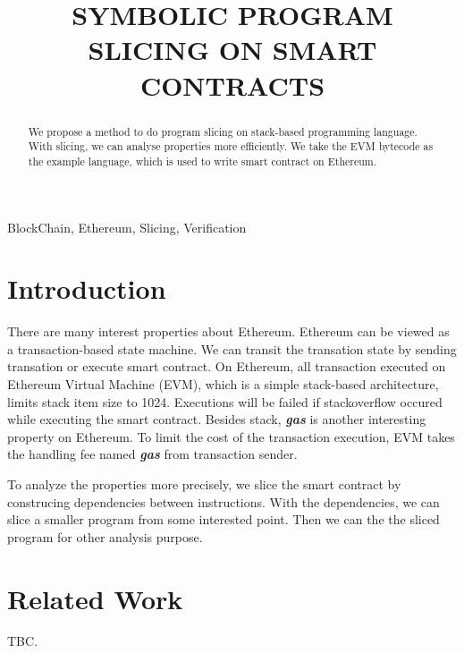 \documentclass{article}
\title{SYMBOLIC PROGRAM SLICING ON SMART CONTRACTS}
\begin{document}
%

\maketitle

%

\begin{abstract}

  We propose a method to do program slicing on stack-based programming language. With slicing, we can analyse properties more efficiently. We take the EVM bytecode\cite{wood2014ethereum} as the example language, which is used to write smart contract\cite{szabo2003advances} on Ethereum\cite{wood2014ethereum}.

\end{abstract}

\begin{keywords}
  BlockChain, Ethereum, Slicing, Verification
\end{keywords}


\section{Introduction}
\label{sec:introduction}

There are many interest properties about Ethereum. Ethereum can be viewed as a transaction-based state machine. We can transit the transation state by sending transation or execute smart contract. On Ethereum, all transaction executed on Ethereum Virtual Machine (EVM), which is a simple stack-based architecture, limits stack item size to 1024. Executions will be failed if stackoverflow occured while executing the smart contract. Besides stack, \textbf{\textit{gas}} is another interesting property on Ethereum. To limit the cost of the transaction execution, EVM takes the handling fee named \textbf{\textit{gas}} from transaction sender.

To analyze the properties more precisely, we slice the smart contract by construcing dependencies between instructions. With the dependencies, we can slice a smaller program from some interested point. Then we can the the sliced program for other analysis purpose.

\section{Related Work}
\label{sec:relatedwork}

TBC.
\end{document}

